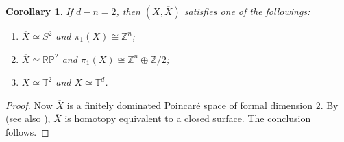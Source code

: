 \documentclass[12pt]{amsart}
\theoremstyle{plain}
\newtheorem{corollary}[theorem]{Corollary}
\theoremstyle{definition}
\theoremstyle{question}
\theoremstyle{remark}
\theoremstyle{assumption}
\numberwithin{equation}{section}
\theoremstyle{bigthm}
\begin{document}
\begin{corollary}\label{cor_Poincare-2}
If $d-n=2$, then $(X, \overline{X})$ satisfies one of the followings:
\begin{enumerate}
\item $\overline{X} \simeq S^{2}$ and $\pi_{1} (X) \cong \mathbb{Z}^{n}$;

\item $\overline{X} \simeq \mathbb{RP}^{2}$ and $\pi_{1} (X) \cong \mathbb{Z}^{n} \oplus \mathbb{Z}/2$;

\item $\overline{X} \simeq \mathbb{T}^{2}$ and $X \simeq \mathbb{T}^{d}$.
\end{enumerate}
\end{corollary}
\begin{proof}
Now $\overline{X}$ is a finitely dominated Poincar\'{e} space of formal dimension $2$. By \cite[Theorem~4]{Eckmann_Linnell} (see also \cite{Eckmann_Muller}), $\overline{X}$ is homotopy equivalent to a closed surface. The conclusion follows.
\end{proof}
\end{document}

